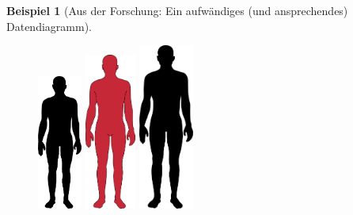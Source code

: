 \documentclass[
  a4paper,
]{scrbook}
\theoremstyle{definition}
\newtheorem{example}{Beispiel}[chapter]
\theoremstyle{definition}
\theoremstyle{definition}
\theoremstyle{remark}
\begin{document}
\begin{example}[Aus der Forschung: Ein aufwändiges (und ansprechendes)
Datendiagramm]
\begin{figure}
\begin{minipage}{0.20\linewidth}
\end{minipage}%
%
\begin{minipage}{0.20\linewidth}

\includegraphics[width=0.13\textwidth,height=\textheight]{img/Human_Silhouette.svg.png}

\end{minipage}%
%
\begin{minipage}{0.20\linewidth}

\includegraphics[width=0.15\textwidth,height=\textheight]{img/human-red.png}

\end{minipage}%
%
\begin{minipage}{0.20\linewidth}

\includegraphics[width=0.16\textwidth,height=\textheight]{img/Human_Silhouette.svg.png}


\end{minipage}
\end{figure}
\end{example}
\end{document}
